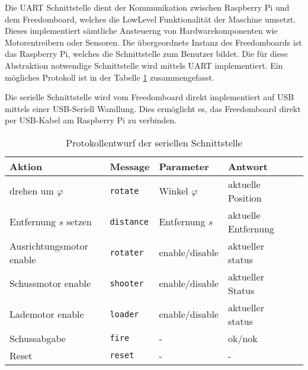 Die UART Schnittstelle dient der Kommunikation zwischen Raspberry Pi und
dem Freedomboard, welches die LowLevel Funktionalität der Maschine 
umsetzt. Dieses implementiert sämtliche Ansteuerng von Hardwarekomponenten
wie Motorentreibern oder Sensoren. Die übergeordnete Instanz des Freedomboards
ist das Raspberry Pi, welches die Schnittstelle zum Benutzer bildet. Die für
diese Abstraktion notwendige Schnittstelle wird mittels UART
implementiert. Ein mögliches Protokoll ist in der Tabelle \ref{tab:uart}
zusammengefasst.

Die serielle Schnittstelle wird vom Freedomboard direkt implementiert auf
USB mittels einer USB-Seriell Wandlung. Dies ermöglicht es, das Freedomboard
direkt per USB-Kabel am Raspberry Pi zu verbinden.

\begin{table}[h!]
	\centering
	\begin{tabular}{l l l l l}
		Aktion & Message & Parameter & Antwort \\
		\hline
		drehen um $\varphi$ 
			& \verb!rotate!
			& Winkel $\varphi$
			& aktuelle Position \\
		Entfernung $s$ setzen
			& \verb!distance!
			& Entfernung $s$
			& aktuelle Entfernung \\
		Ausrichtungsmotor enable
			& \verb!rotater!
			& enable/disable
			& aktueller status\\
		Schussmotor enable
			& \verb!shooter! 
			& enable/disable
			& aktueller Status \\
		Lademotor enable
			& \verb!loader!
			& enable/disable
			& aktueller status\\
		Schussabgabe
			& \verb!fire!
			& -
			& ok/nok\\
		Reset
			& \verb!reset!
			& -
			& -\\
	\end{tabular}
	\caption{Protokollentwurf der seriellen Schnittstelle}
	\label{tab:uart}
\end{table}
